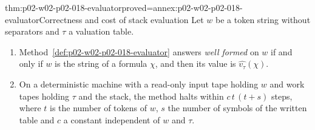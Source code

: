 \begin{hblemma}{thm:p02-w02-p02-018-evaluator}{proved=annex:p02-w02-p02-018-evaluator}{Correctness and cost of stack evaluation}
Let \(w\) be a token string without separators and \(\tau\) a valuation
table.
\begin{enumerate}
\item Method~\ref{def:p02-w02-p02-018-evaluator} answers \emph{well formed}
      on \(w\) if and only if \(w\) is the string of a formula \(\chi\), and
      then its value is \(\widehat{v_\tau}(\chi)\).
\item On a deterministic machine with a read-only input tape holding \(w\)
      and work tapes holding \(\tau\) and the stack, the method halts within
      \(c\,t\,(t+s)\) steps, where \(t\) is the number of tokens of \(w\),
      \(s\) the number of symbols of the written table and \(c\) a constant
      independent of \(w\) and \(\tau\).
\end{enumerate}
\end{hblemma}

